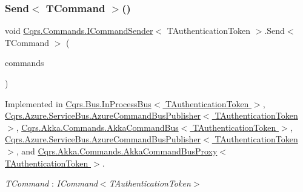 \subsubsection{\texorpdfstring{Send$<$ T\+Command $>$()}{Send< TCommand >()}\hspace{0.1cm}{\footnotesize\ttfamily [2/2]}}
{\footnotesize\ttfamily void \hyperlink{interfaceCqrs_1_1Commands_1_1ICommandSender}{Cqrs.\+Commands.\+I\+Command\+Sender}$<$ T\+Authentication\+Token $>$.Send$<$ T\+Command $>$ (\begin{DoxyParamCaption}\item[{I\+Enumerable$<$ T\+Command $>$}]{commands }\end{DoxyParamCaption})}



Implemented in \hyperlink{classCqrs_1_1Bus_1_1InProcessBus_ae5dae5f2445387280c974ec181167055}{Cqrs.\+Bus.\+In\+Process\+Bus$<$ T\+Authentication\+Token $>$}, \hyperlink{classCqrs_1_1Azure_1_1ServiceBus_1_1AzureCommandBusPublisher_a1f6742c31a81a1bc96962acd28d4e8d2}{Cqrs.\+Azure.\+Service\+Bus.\+Azure\+Command\+Bus\+Publisher$<$ T\+Authentication\+Token $>$}, \hyperlink{classCqrs_1_1Akka_1_1Commands_1_1AkkaCommandBus_a06b7b148493c67d79aaf6b7d59afa487}{Cqrs.\+Akka.\+Commands.\+Akka\+Command\+Bus$<$ T\+Authentication\+Token $>$}, \hyperlink{classCqrs_1_1Azure_1_1ServiceBus_1_1AzureCommandBusPublisher_a1f6742c31a81a1bc96962acd28d4e8d2}{Cqrs.\+Azure.\+Service\+Bus.\+Azure\+Command\+Bus\+Publisher$<$ T\+Authentication\+Token $>$}, and \hyperlink{classCqrs_1_1Akka_1_1Commands_1_1AkkaCommandBusProxy_a30115e2f8c964967aa8fe94712ece7c2}{Cqrs.\+Akka.\+Commands.\+Akka\+Command\+Bus\+Proxy$<$ T\+Authentication\+Token $>$}.

\begin{Desc}
\item[Type Constraints]\begin{description}
\item[{\em T\+Command} : {\em I\+Command$<$T\+Authentication\+Token$>$}]\end{description}
\end{Desc}
